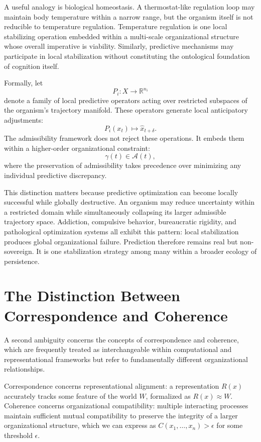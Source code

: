 \documentclass[12pt,a4paper]{report}
\theoremstyle{flyxion}
\begin{document}
A useful analogy is biological homeostasis. A thermostat-like regulation loop may maintain body temperature within a narrow range, but the organism itself is not reducible to temperature regulation. Temperature regulation is one local stabilizing operation embedded within a multi-scale organizational structure whose overall imperative is viability. Similarly, predictive mechanisms may participate in local stabilization without constituting the ontological foundation of cognition itself.

Formally, let
\[
P_i : X \rightarrow \mathbb{R}^{n_i}
\]
denote a family of local predictive operators acting over restricted subspaces of the organism's trajectory manifold. These operators generate local anticipatory adjustments:
\[
P_i(x_t) \mapsto \hat{x}_{t+\delta}.
\]
The admissibility framework does not reject these operations. It embeds them within a higher-order organizational constraint:
\[
\gamma(t) \in \mathcal{A}(t),
\]
where the preservation of admissibility takes precedence over minimizing any individual predictive discrepancy.

This distinction matters because predictive optimization can become locally successful while globally destructive. An organism may reduce uncertainty within a restricted domain while simultaneously collapsing its larger admissible trajectory space. Addiction, compulsive behavior, bureaucratic rigidity, and pathological optimization systems all exhibit this pattern: local stabilization produces global organizational failure. Prediction therefore remains real but non-sovereign. It is one stabilization strategy among many within a broader ecology of persistence.

\section{The Distinction Between Correspondence and Coherence}

A second ambiguity concerns the concepts of correspondence and coherence, which are frequently treated as interchangeable within computational and representational frameworks but refer to fundamentally different organizational relationships.

Correspondence concerns representational alignment: a representation $R(x)$ accurately tracks some feature of the world $W$, formalized as $R(x) \approx W$. Coherence concerns organizational compatibility: multiple interacting processes maintain sufficient mutual compatibility to preserve the integrity of a larger organizational structure, which we can express as $C(x_1,\dots,x_n) > \epsilon$ for some threshold $\epsilon$.
\end{document}
